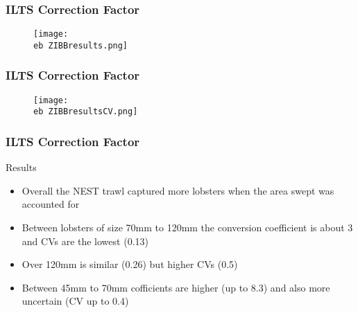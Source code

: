 \documentclass{beamer}
\newcommand{\eb}{\string~/bio.data/bio.lobster/figures/ILTS/} %
\begin{document}
\begin{frame}
\frametitle{ILTS Correction Factor}
\begin{figure}
        \begin{center}
            \texttt{[image: \\eb ZIBBresults.png]}
        \end{center}
    \end{figure}
\end{frame}

\begin{frame}
\frametitle{ILTS Correction Factor}
\begin{figure}
        \begin{center}
            \texttt{[image: \\eb ZIBBresultsCV.png]}
        \end{center}
    \end{figure}
\end{frame}


\begin{frame}
\frametitle{ILTS Correction Factor}
Results
\begin{itemize}
\item Overall the NEST trawl captured more lobsters when the area swept was accounted for
\item Between lobsters of size 70mm to 120mm the conversion coefficient is about 3 and CVs are the lowest (0.13)
\item Over 120mm is similar (0.26) but higher CVs (0.5) 
\item Between 45mm to 70mm cofficients are higher (up to 8.3) and also more uncertain (CV up to 0.4)
\end{itemize}

\end{frame}
\end{document}
